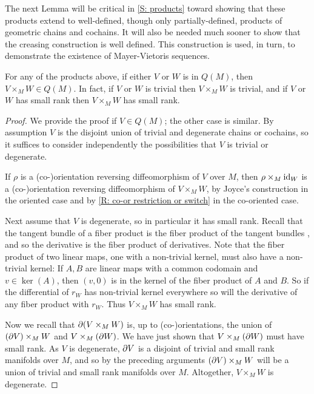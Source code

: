 The next Lemma will be critical in \cref{S: products} toward showing that these products extend to well-defined, though only partially-defined, products of geometric chains and cochains. It will also be needed much sooner to show that the creasing construction is well defined. This construction is used, in turn, to demonstrate the existence of Mayer-Vietoris sequences.

\begin{lemma}\label{L: pullback with Q}
For any of the products above, if either $V$ or $W$ is in $Q(M)$, then $V\times_MW\in Q(M)$. In fact, if $V$ or $W$ is trivial then $V\times_MW$ is trivial, and if $V$ or $W$ has small rank then $V\times_MW$ has small rank.
\end{lemma}
\begin{proof}
We provide the proof if $V\in Q(M)$; the other case is similar. By assumption $V$ is the disjoint union of trivial and degenerate chains or cochains, so it suffices to consider independently the possibilities that $V$ is trivial or degenerate.

If $\rho$ is a (co-)orientation reversing diffeomorphism of $V$ over $M$, then  $\rho\times_M  \mathrm{id}_W$ is a (co-)orientation reversing diffeomorphism of  $V\times_M W$, by Joyce's construction in the oriented case and by \cref{R: co-or restriction or switch} in the co-oriented case.

Next assume that $V$ is degenerate, so in particular it has small rank. Recall that the tangent bundle of a fiber product is the fiber product of the tangent bundles \cite[Theorem 5.47]{Wed16}, and so the derivative is the fiber product of derivatives.
Note that the fiber product of two linear maps, one with a non-trivial kernel, must also have a non-trivial kernel: If $A,B$ are linear maps with a common codomain and $v\in \ker(A)$, then $(v,0)$ is in the kernel of the fiber product  of $A$ and $B$.
So if  the differential of $r_W$ has non-trivial kernel everywhere so will the derivative of any fiber product with $r_W$. Thus $V\times_M W$ has small rank.

Now we recall that $\partial(V\times_M W)$ is, up to (co-)orientations, the union of $(\partial V)\times_M W$ and $V\times_M(\partial W)$. We have just shown that  $V\times_M(\partial W)$ must have small rank. As $V$ is degenerate, $\partial V$ is a disjoint of trivial and small rank manifolds over $M$, and so by the preceding arguments $(\partial V)\times_M W$ will be a union of trivial and small rank manifolds over $M$. Altogether, $V\times_M W$ is degenerate.
\end{proof}


